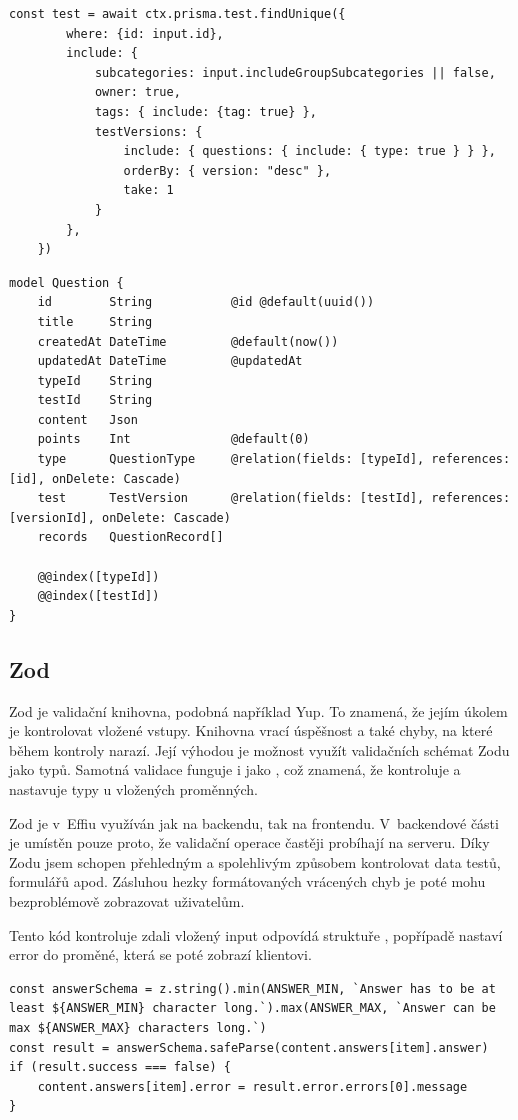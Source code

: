 \documentclass[12pt, a4paper,
openright
]{report}
\begin{document}
\begin{lstlisting}[style=ES6, caption=Získání testu podle id a přidání dat ze spojených tabulek, label=prisma_code_use]
	const test = await ctx.prisma.test.findUnique({
		where: {id: input.id},
		include: {
			subcategories: input.includeGroupSubcategories || false,
			owner: true,
			tags: {	include: {tag: true} },
			testVersions: {
				include: { questions: { include: { type: true } } },
				orderBy: { version: "desc" },
				take: 1
			}
		},
	})
\end{lstlisting}

\begin{lstlisting}[style=ES6, caption=Schéma modelu verze testu, label=prisma_code_schema]
model Question {
	id        String           @id @default(uuid())
	title     String
	createdAt DateTime         @default(now())
	updatedAt DateTime         @updatedAt
	typeId    String
	testId    String
	content   Json
	points    Int              @default(0)
	type      QuestionType     @relation(fields: [typeId], references: [id], onDelete: Cascade)
	test      TestVersion      @relation(fields: [testId], references: [versionId], onDelete: Cascade)
	records   QuestionRecord[]
	
	@@index([typeId])
	@@index([testId])
}
\end{lstlisting}

\subsection{Zod}
Zod je validační knihovna, podobná například Yup. To znamená, že jejím úkolem je kontrolovat vložené vstupy. Knihovna vrací úspěšnost a také chyby, na které během kontroly narazí. Její výhodou je možnost využít validačních schémat Zodu jako typů. Samotná validace funguje i jako , což znamená, že kontroluje a nastavuje typy u vložených proměnných.

Zod je v~Effiu využíván jak na backendu, tak na frontendu. V~backendové části je umístěn pouze proto, že validační operace častěji probíhají na serveru. Díky Zodu jsem schopen přehledným a spolehlivým způsobem kontrolovat data testů, formulářů apod. Zásluhou hezky formátovaných vrácených chyb je poté mohu bezproblémově zobrazovat uživatelům.

Tento kód kontroluje zdali vložený input odpovídá struktuře , popřípadě nastaví error do proměné, která se poté zobrazí klientovi.

\begin{lstlisting}[style=ES6, caption=Validace vstupu pomocí validační knihovny Zod, label=zod]
const answerSchema = z.string().min(ANSWER_MIN, `Answer has to be at least ${ANSWER_MIN} character long.`).max(ANSWER_MAX, `Answer can be max ${ANSWER_MAX} characters long.`)
const result = answerSchema.safeParse(content.answers[item].answer)
if (result.success === false) {
	content.answers[item].error = result.error.errors[0].message
}
\end{lstlisting}
\end{document}

